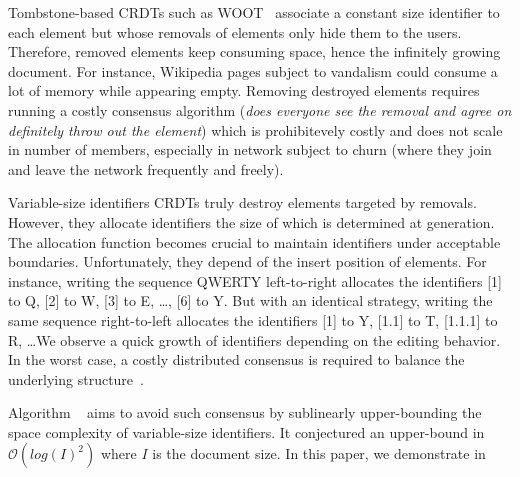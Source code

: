 \begin{asparadesc}
\item [Tombstone-based] CRDTs such as WOOT~\cite{oster2006data} associate a
  constant size identifier to each element but whose removals of elements only
  hide them to the users. Therefore, removed elements keep consuming space,
  hence the infinitely growing document. For instance, Wikipedia pages subject
  to vandalism could consume a lot of memory while appearing empty. Removing
  destroyed elements requires running a costly consensus algorithm (\emph{does
    everyone see the removal and agree on definitely throw out the element})
  which is prohibitevely costly and does not scale in number of members,
  especially in network subject to churn (where they join and leave the network
  frequently and freely).

\item [Variable-size identifiers] CRDTs truly destroy elements targeted by
  removals. However, they allocate identifiers the size of which is determined
  at generation. The allocation function becomes crucial to maintain identifiers
  under acceptable boundaries. Unfortunately, they depend of the insert position
  of elements. For instance, writing the sequence QWERTY left-to-right allocates
  the identifiers [1] to Q, [2] to W, [3] to E, \ldots, [6] to Y. But with an
  identical strategy, writing the same sequence right-to-left allocates the
  identifiers [1] to Y, [1.1] to T, [1.1.1] to R, \ldots We observe a quick
  growth of identifiers depending on the editing behavior.  In the worst case, a
  costly distributed consensus is required to balance the underlying
  structure~\cite{zawirski2011asynchronous}.

  Algorithm \LSEQ~\cite{nedelec2013lseq} aims to avoid such consensus by
  sublinearly upper-bounding the space complexity of variable-size
  identifiers. It conjectured an upper-bound in $\mathcal{O}(log(I)^2)$ where
  $I$ is the document size. In this paper, we demonstrate in 


\end{asparadesc}
